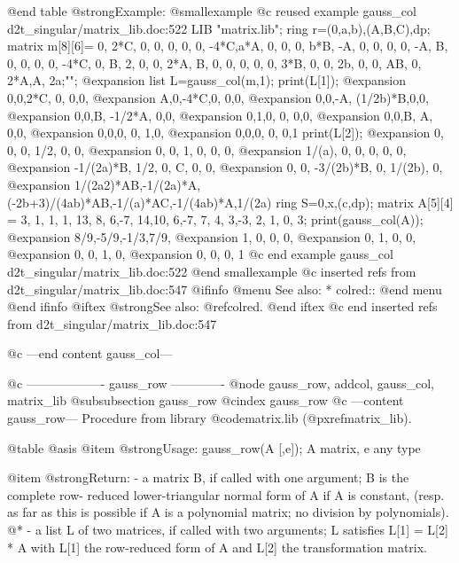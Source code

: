 @end table
@strong{Example:}
@smallexample
@c reused example gauss_col d2t_singular/matrix_lib.doc:522 
LIB "matrix.lib";
ring r=(0,a,b),(A,B,C),dp;
matrix m[8][6]=
0,    2*C, 0,    0,  0,   0,
0,    -4*C,a*A,  0,  0,   0,
b*B,  -A,  0,    0,  0,   0,
-A,   B,   0,    0,  0,   0,
-4*C, 0,   B,    2,  0,   0,
2*A,  B,   0,    0,  0,   0,
0,    3*B, 0,    0,  2b,  0,
0,    AB,  0,    2*A,A,   2a;"";
@expansion{} 
list L=gauss_col(m,1);
print(L[1]);
@expansion{} 0,0,2*C, 0,       0,0,
@expansion{} A,0,-4*C,0,       0,0,
@expansion{} 0,0,-A,  (1/2b)*B,0,0,
@expansion{} 0,0,B,   -1/2*A,  0,0,
@expansion{} 0,1,0,   0,       0,0,
@expansion{} 0,0,B,   A,       0,0,
@expansion{} 0,0,0,   0,       1,0,
@expansion{} 0,0,0,   0,       0,1 
print(L[2]);
@expansion{} 0,         0,        0,               1/2,      0,         0,    
@expansion{} 0,         0,        1,               0,        0,         0,    
@expansion{} 1/(a),     0,        0,               0,        0,         0,    
@expansion{} -1/(2a)*B, 1/2,      0,               C,        0,         0,    
@expansion{} 0,         0,        -3/(2b)*B,       0,        1/(2b),    0,    
@expansion{} 1/(2a2)*AB,-1/(2a)*A,(-2b+3)/(4ab)*AB,-1/(a)*AC,-1/(4ab)*A,1/(2a)
ring S=0,x,(c,dp);
matrix A[5][4] =
3, 1, 1, 1,
13, 8, 6,-7,
14,10, 6,-7,
7, 4, 3,-3,
2, 1, 0, 3;
print(gauss_col(A));
@expansion{} 8/9,-5/9,-1/3,7/9,
@expansion{} 1,  0,   0,   0,  
@expansion{} 0,  1,   0,   0,  
@expansion{} 0,  0,   1,   0,  
@expansion{} 0,  0,   0,   1   
@c end example gauss_col d2t_singular/matrix_lib.doc:522
@end smallexample
@c inserted refs from d2t_singular/matrix_lib.doc:547
@ifinfo
@menu
See also:
* colred::
@end menu
@end ifinfo
@iftex
@strong{See also:}
@ref{colred}.
@end iftex
@c end inserted refs from d2t_singular/matrix_lib.doc:547

@c ---end content gauss_col---

@c ------------------- gauss_row -------------
@node gauss_row, addcol, gauss_col, matrix_lib
@subsubsection gauss_row
@cindex gauss_row
@c ---content gauss_row---
Procedure from library @code{matrix.lib} (@pxref{matrix_lib}).

@table @asis
@item @strong{Usage:}
gauss_row(A [,e]); A matrix, e any type

@item @strong{Return:}
- a matrix B, if called with one argument; B is the complete row-
reduced lower-triangular normal form of A if A is constant,
(resp. as far as this is possible if A is a polynomial matrix;
no division by polynomials).
@* - a list L of two matrices, if called with two arguments;
L satisfies L[1] = L[2] * A with L[1] the row-reduced form of A
and L[2] the transformation matrix.

